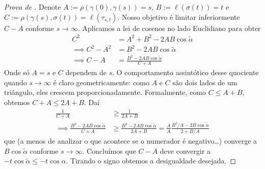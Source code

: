 \begin{proof}[Prova de \cite{Cheeger-Ebin}]
Denote $A:=\rho(\gamma(0),\gamma(s))=s$, $B:=\ell(\sigma(t))=t$ e
 $C:=\rho(\gamma(s),\sigma(t))=\ell(\tau_{s,t})$.
Nosso objetivo é limitar inferiormente $C-A$ conforme  $s \to \infty$.
 Aplicamos a lei de cosenos no lado Euclidiano para obter
\begin{align*}
C^2&=A^2+B^2-2AB\cos\tilde{\alpha}\\
\implies C^2-A^2&=B^2-2AB\cos\tilde{\alpha}\\
\implies C-A&=\frac{B^2-2AB\cos\tilde{\alpha}}{C+A}
\end{align*}
Onde só $A=s$ e $C$ dependem de $s$. O comportamento assintótico desse quociente
quando $s \to \infty$ é claro geometricamente: como $A$ e $C$ são dois lados de
um triângulo, eles crescem proporcionadamente. Formalmente, como $C \leq A+B$,
obtemos $C+A \leq 2A+B$. Daí
\begin{align*}
\frac{1}{C+A}&\geq \frac{1}{2A+B}\\
\implies \frac{B^2-2AB\cos \tilde{\alpha}}{C+A}&\geq
 \frac{B^2-2AB \cos \tilde{\alpha}}{2A+B}
=\frac{A}{A}\frac{B^2/A-2B\cos \tilde{\alpha}}{2+B/A}
\end{align*}
que (a menos de analizar o que acontece se o numerador é negativo…)
 converge a $B\cos \tilde{\alpha}$ conforme $s \to \infty$.
 Concluímos que $C-A$ deve
convergir a $-t\cos\tilde{\alpha}\leq-t\cos\alpha$. Tirando o signo obtemos a
desigualdade desejada.
\end{proof}
